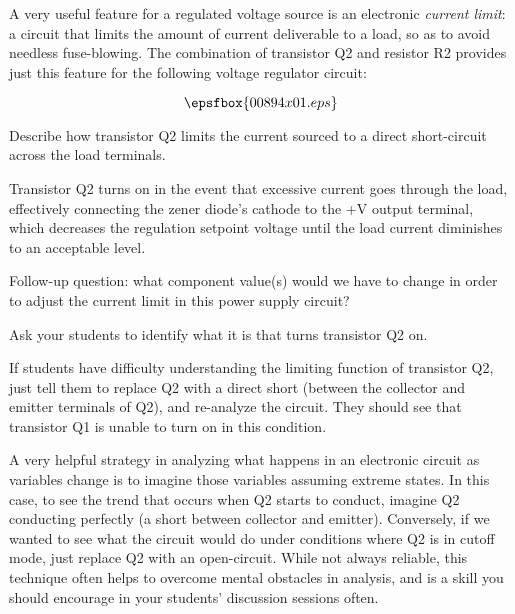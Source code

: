 

A very useful feature for a regulated voltage source is an electronic {\it current limit}: a circuit that limits the amount of current deliverable to a load, so as to avoid needless fuse-blowing.  The combination of transistor Q2 and resistor R2 provides just this feature for the following voltage regulator circuit:

$$\epsfbox{00894x01.eps}$$

Describe how transistor Q2 limits the current sourced to a direct short-circuit across the load terminals.







Transistor Q2 turns on in the event that excessive current goes through the load, effectively connecting the zener diode's cathode to the +V output terminal, which decreases the regulation setpoint voltage until the load current diminishes to an acceptable level.

\vskip 10pt

Follow-up question: what component value(s) would we have to change in order to adjust the current limit in this power supply circuit?







Ask your students to identify what it is that turns transistor Q2 on.

If students have difficulty understanding the limiting function of transistor Q2, just tell them to replace Q2 with a direct short (between the collector and emitter terminals of Q2), and re-analyze the circuit.  They should see that transistor Q1 is unable to turn on in this condition.

A very helpful strategy in analyzing what happens in an electronic circuit as variables change is to imagine those variables assuming extreme states.  In this case, to see the trend that occurs when Q2 starts to conduct, imagine Q2 conducting perfectly (a short between collector and emitter).  Conversely, if we wanted to see what the circuit would do under conditions where Q2 is in cutoff mode, just replace Q2 with an open-circuit.  While not always reliable, this technique often helps to overcome mental obstacles in analysis, and is a skill you should encourage in your students' discussion sessions often.



